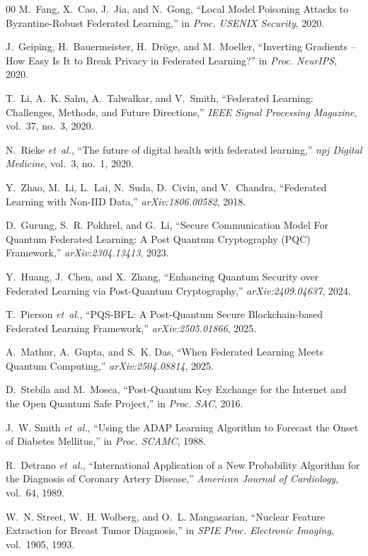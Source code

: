 \documentclass[runningheads]{llncs}
\begin{document}
\begin{thebibliography}{00}
M.~Fang, X.~Cao, J.~Jia, and N.~Gong,
``Local Model Poisoning Attacks to Byzantine-Robust Federated
Learning,'' in \emph{Proc. USENIX Security}, 2020.

J.~Geiping, H.~Bauermeister, H.~Dr{\"o}ge, and M.~Moeller,
``Inverting Gradients -- How Easy Is It to Break Privacy in
Federated Learning?'' in \emph{Proc. NeurIPS}, 2020.

T.~Li, A.~K. Sahu, A.~Talwalkar, and V.~Smith,
``Federated Learning: Challenges, Methods, and Future Directions,''
\emph{IEEE Signal Processing Magazine}, vol.~37, no.~3, 2020.

N.~Rieke \emph{et~al.},
``The future of digital health with federated learning,''
\emph{npj Digital Medicine}, vol.~3, no.~1, 2020.

Y.~Zhao, M.~Li, L.~Lai, N.~Suda, D.~Civin, and V.~Chandra,
``Federated Learning with Non-IID Data,''
\emph{arXiv:1806.00582}, 2018.

D.~Gurung, S.~R. Pokhrel, and G.~Li,
``Secure Communication Model For Quantum Federated Learning:
A Post Quantum Cryptography (PQC) Framework,''
\emph{arXiv:2304.13413}, 2023.

Y.~Huang, J.~Chen, and X.~Zhang,
``Enhancing Quantum Security over Federated Learning via
Post-Quantum Cryptography,''
\emph{arXiv:2409.04637}, 2024.

T.~Pierson \emph{et~al.},
``PQS-BFL: A Post-Quantum Secure Blockchain-based Federated
Learning Framework,''
\emph{arXiv:2505.01866}, 2025.

A.~Mathur, A.~Gupta, and S.~K. Das,
``When Federated Learning Meets Quantum Computing,''
\emph{arXiv:2504.08814}, 2025.

D.~Stebila and M.~Mosca,
``Post-Quantum Key Exchange for the Internet and the Open Quantum Safe
Project,'' in \emph{Proc. SAC}, 2016.

J.~W. Smith \emph{et~al.},
``Using the ADAP Learning Algorithm to Forecast the Onset of Diabetes
Mellitus,'' in \emph{Proc. SCAMC}, 1988.

R.~Detrano \emph{et~al.},
``International Application of a New Probability Algorithm for the
Diagnosis of Coronary Artery Disease,''
\emph{American Journal of Cardiology}, vol.~64, 1989.

W.~N. Street, W.~H. Wolberg, and O.~L. Mangasarian,
``Nuclear Feature Extraction for Breast Tumor Diagnosis,''
in \emph{SPIE Proc. Electronic Imaging}, vol.~1905, 1993.

\end{thebibliography}
\end{document}
